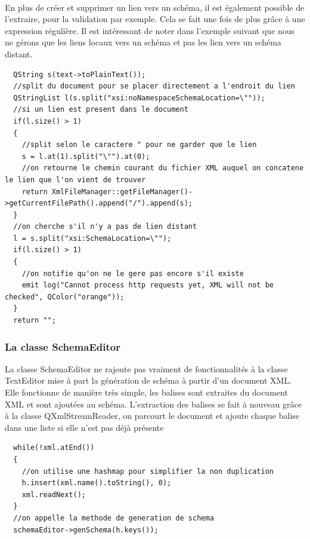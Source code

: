 \paragraph{}
En plus de créer et supprimer un lien vers un schéma, il est également possible de l'extraire, pour la validation par exemple. Cela se fait une fois de plus grâce à une expression régulière. Il est intéressant de noter dans l'exemple suivant que nous ne gérons que les liens locaux vers un schéma et pas les lien vers un schéma distant.
\begin{lstlisting}
  QString s(text->toPlainText());
  //split du document pour se placer directement a l'endroit du lien
  QStringList l(s.split("xsi:noNamespaceSchemaLocation=\""));
  //si un lien est present dans le document
  if(l.size() > 1)
  {
    //split selon le caractere " pour ne garder que le lien
    s = l.at(1).split("\"").at(0);
    //on retourne le chemin courant du fichier XML auquel on concatene le lien que l'on vient de trouver
    return XmlFileManager::getFileManager()->getCurrentFilePath().append("/").append(s);
  }
  //on cherche s'il n'y a pas de lien distant
  l = s.split("xsi:SchemaLocation=\"");
  if(l.size() > 1)
  {
    //on notifie qu'on ne le gere pas encore s'il existe
    emit log("Cannot process http requests yet, XML will not be checked", QColor("orange"));
  }
  return "";
\end{lstlisting}
\paragraph{}
\subsubsection{La classe SchemaEditor}
La classe SchemaEditor ne rajoute pas vraiment de fonctionnalités à la classe TextEditor mise à part la génération de schéma à partir d'un document XML. Elle fonctionne de manière très simple, les balises sont extraites du document XML et sont ajoutées au schéma. L'extraction des balises se fait à nouveau grâce à la classe QXmlStreamReader, on parcourt le document et ajoute chaque balise dans une liste si elle n'est pas déjà présente

\begin{lstlisting}
  while(!xml.atEnd())
  {
    //on utilise une hashmap pour simplifier la non duplication
    h.insert(xml.name().toString(), 0);
    xml.readNext();
  }
  //on appelle la methode de generation de schema
  schemaEditor->genSchema(h.keys());
\end{lstlisting}
